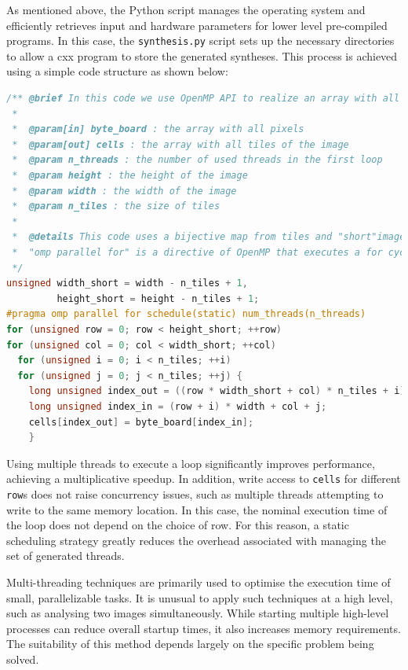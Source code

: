\begin{toReview}
    \noindent As mentioned above, the \gls{Python} script manages the operating system and efficiently retrieves input and hardware parameters for lower level pre-compiled programs. In this case, the \texttt{synthesis.py} script sets up the necessary directories to allow a \gls{cxx} program to store the generated syntheses. This process is achieved using a simple code structure as shown below:

\begin{lstlisting}[style=code, language=C, rulecolor=\color{blue}]
/** @brief In this code we use OpenMP API to realize an array with all tiles.
 *
 *  @param[in] byte_board : the array with all pixels
 *  @param[out] cells : the array with all tiles of the image
 *  @param n_threads : the number of used threads in the first loop
 *  @param height : the height of the image
 *  @param width : the width of the image
 *  @param n_tiles : the size of tiles
 *
 *  @details This code uses a bijective map from tiles and "short"image, i.e. an image with shape width_short, height_short. Each tiles will be assigned to its first pixel (up/sx).
 *  "omp parallel for" is a directive of OpenMP that executes a for cycle using more indipendent threads. In this case the schedule is "static" i.e. each thread knows in advance all its loops.
 */
unsigned width_short = width - n_tiles + 1,
         height_short = height - n_tiles + 1;
#pragma omp parallel for schedule(static) num_threads(n_threads)
for (unsigned row = 0; row < height_short; ++row)
for (unsigned col = 0; col < width_short; ++col)
  for (unsigned i = 0; i < n_tiles; ++i)
  for (unsigned j = 0; j < n_tiles; ++j) {
    long unsigned index_out = ((row * width_short + col) * n_tiles + i) * n_tiles + j; // [row-i, col-j, i,j]
    long unsigned index_in = (row + i) * width + col + j;
    cells[index_out] = byte_board[index_in];
    }\end{lstlisting}

    \noindent Using multiple \gls{thread}s to execute a loop significantly improves performance, achieving a multiplicative speedup. In addition, write access to \texttt{cells} for different \texttt{row}s does not raise concurrency issues, such as multiple \gls{thread}s attempting to write to the same memory location. In this case, the nominal execution time of the loop does not depend on the choice of row. For this reason, a static scheduling strategy greatly reduces the overhead associated with managing the set of generated threads.

    \noindent Multi-threading techniques are primarily used to optimise the execution time of small, parallelizable tasks. It is unusual to apply such techniques at a high level, such as analysing two images simultaneously. While starting multiple high-level processes can reduce overall startup times, it also increases memory requirements. The suitability of this method depends largely on the specific problem being solved.


\end{toReview}
